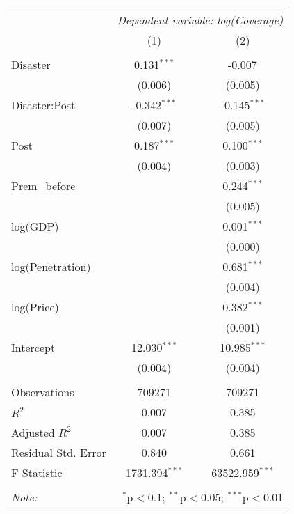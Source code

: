 
\begin{tabular}{@{\extracolsep{5pt}}lcc}
\\[-1.8ex]\hline
\hline \\[-1.8ex]
& \multicolumn{2}{c}{\textit{Dependent variable: log(Coverage)}} \
\cr \cline{2-3}
\\[-1.8ex] & (1) & (2) \\
\hline \\[-1.8ex]
 Disaster & 0.131$^{***}$ & -0.007$^{}$ \\
& (0.006) & (0.005) \\
 Disaster:Post & -0.342$^{***}$ & -0.145$^{***}$ \\
& (0.007) & (0.005) \\
 Post & 0.187$^{***}$ & 0.100$^{***}$ \\
& (0.004) & (0.003) \\
 Prem\_before & & 0.244$^{***}$ \\
& & (0.005) \\
 log(GDP) & & 0.001$^{***}$ \\
& & (0.000) \\
 log(Penetration) & & 0.681$^{***}$ \\
& & (0.004) \\
 log(Price) & & 0.382$^{***}$ \\
& & (0.001) \\
Intercept & 12.030$^{***}$ & 10.985$^{***}$ \\
& (0.004) & (0.004) \\
\hline \\[-1.8ex]
 Observations & 709271 & 709271 \\
 $R^2$ & 0.007 & 0.385 \\
 Adjusted $R^2$ & 0.007 & 0.385 \\
 Residual Std. Error & 0.840  & 0.661  \\
 F Statistic & 1731.394$^{***}$  & 63522.959$^{***}$  \\
\hline
\hline \\[-1.8ex]
\textit{Note:} & \multicolumn{2}{r}{$^{*}$p$<$0.1; $^{**}$p$<$0.05; $^{***}$p$<$0.01} \\
\end{tabular}
